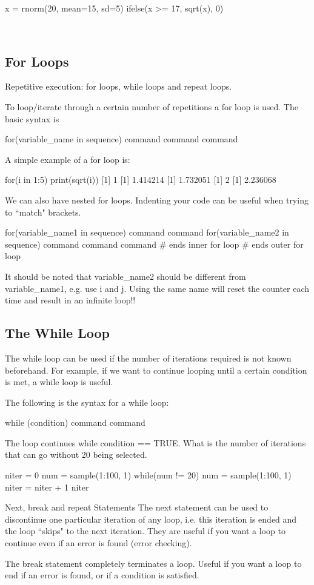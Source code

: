 x = rnorm(20, mean=15, sd=5)
ifelse(x >= 17, sqrt(x), 0)



 
\subsection{For Loops}

Repetitive execution: for loops, while loops and repeat loops.

To loop/iterate through a certain number of repetitions a for loop
is used. The basic syntax is

for(variable_name in sequence) {
command
command
command
}

A simple example of a for loop is:

for(i in 1:5){
print(sqrt(i))
}
[1] 1
[1] 1.414214
[1] 1.732051
[1] 2
[1] 2.236068


We can also have nested for loops. Indenting your code can be useful
when trying to “match" brackets.

for(variable_name1 in sequence) 
{
command
command
for(variable_name2 in sequence)
    {
    command
    command 
    command
    } # ends inner for loop
} # ends outer for loop

It should be noted that variable_name2 should be different from
variable_name1, e.g. use i and j. Using the same name will
reset the counter each time and result in an infinite loop!!



\subsection{The While Loop}
The while loop can be used if the number of iterations required is not known beforehand. For example, if we want to continue looping until a certain condition is met, a while loop is useful.

The following is the syntax for a while loop:

while (condition){
command
command
}

The loop continues while condition == TRUE.
What is the number of iterations that can go without 20 being selected.

niter = 0		
num = sample(1:100, 1)
while(num != 20) 
   {
    num = sample(1:100, 1)
    niter = niter + 1
   }
niter

Next, break and repeat Statements
The next statement can be used to discontinue one particular iteration of any loop, i.e. this iteration is ended and the loop “skips" to the next iteration. They are useful if you want a loop to continue even if an error is found (error checking).

The break statement completely terminates a loop. Useful if you want a loop to end if an error is found, or if a condition is satisfied.




 

